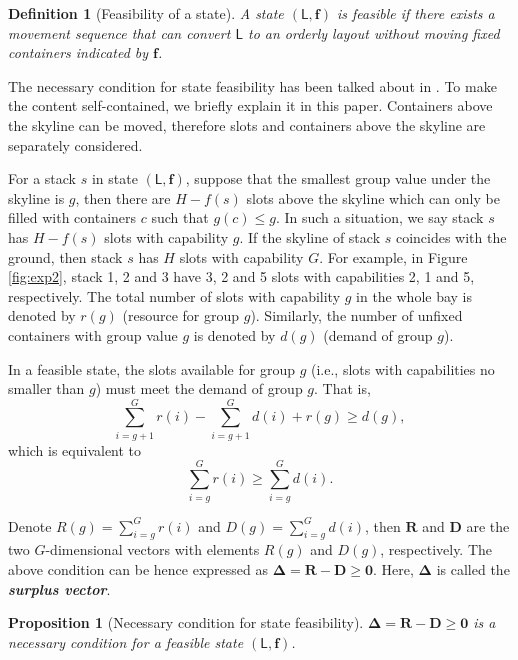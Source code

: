 \documentclass[review,3p,times,12pt,number]{elsarticle}\usepackage{amsmath}\usepackage{amssymb}
\newtheorem{proposition}{Proposition}
\newtheorem{definition}{Definition}
\renewcommand{\citet}[1]{\citeauthor{#1} \citep{#1}}
\renewcommand{\emph}[1]{\textbf{\textit{#1}}}
\begin{document}
\begin{definition}[Feasibility of a state]
A state $(\mathsf{L},\boldsymbol{f})$ is feasible if there exists a movement sequence that can convert $\mathsf{L}$ to an orderly layout without moving fixed containers indicated by $\boldsymbol{f}$.
\end{definition}

The necessary condition for state feasibility has been talked about in \citet{wang2014}. To make the content self-contained, we briefly explain it in this paper. Containers above the skyline can be moved, therefore slots and containers above the skyline are separately considered.

For a stack $s$ in state $(\mathsf{L},\boldsymbol{f})$, suppose that the smallest group value under the skyline is $g$, then there are $H-f(s)$ slots above the skyline which can only be filled with containers $c$ such that $g(c)\le g$. In such a situation, we say stack $s$ has $H-f(s)$ slots with capability $g$.
If the skyline of stack $s$ coincides with the ground, then stack $s$ has $H$ slots with capability $G$.
For example, in Figure \ref{fig:exp2}, stack 1, 2 and 3 have 3, 2 and 5 slots with capabilities 2, 1 and 5, respectively. The total number of slots with capability $g$ in the whole bay is denoted by $r(g)$ (resource for group $g$).
Similarly, the number of unfixed containers with group value $g$ is denoted by $d(g)$ (demand of group $g$).

In a feasible state, the slots available for group $g$ (i.e., slots with capabilities no smaller than $g$) must meet the demand of group $g$. That is,
\begin{equation*}
\sum^G_{i=g+1}r(i)-\sum^G_{i=g+1}d(i)+r(g)\ge d(g),
\end{equation*}
which is equivalent to
\begin{equation*}
\sum^G_{i=g}r(i)\ge \sum^G_{i=g} d(i).
\end{equation*}

Denote $R(g)=\sum^G_{i=g}r(i)$ and $D(g)=\sum^G_{i=g}d(i)$, then $\boldsymbol R$ and $\boldsymbol D$ are the two $G$-dimensional vectors with elements $R(g)$ and $D(g)$, respectively. The above condition can be hence expressed as $\boldsymbol{\Delta}=\boldsymbol{R}-\boldsymbol{D}\ge \boldsymbol{0}$. Here, $\boldsymbol \Delta$ is called the \emph{surplus vector}.



\begin{proposition}[Necessary condition for state feasibility]
$\boldsymbol{\Delta}=\boldsymbol{R}-\boldsymbol{D}\ge \boldsymbol{0}$ is a necessary condition for a feasible state $(\mathsf{L},\boldsymbol{f})$.
\end{proposition}
\end{document}
